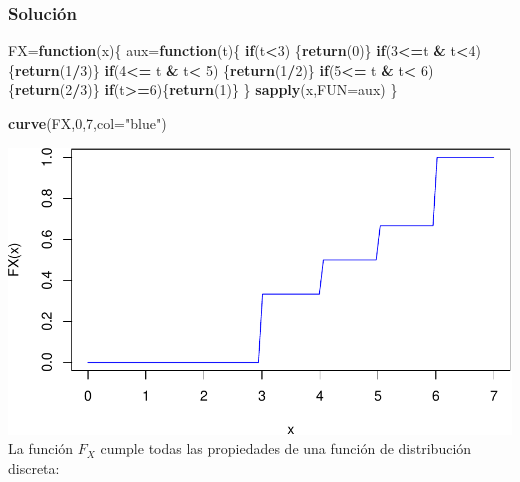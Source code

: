 \documentclass[]{article}
\newenvironment{Shaded}{\begin{snugshade}}{\end{snugshade}}
\newcommand{\ControlFlowTok}[1]{\textcolor[rgb]{0.13,0.29,0.53}{\textbf{#1}}}
\newcommand{\DataTypeTok}[1]{\textcolor[rgb]{0.13,0.29,0.53}{#1}}
\newcommand{\DecValTok}[1]{\textcolor[rgb]{0.00,0.00,0.81}{#1}}
\newcommand{\KeywordTok}[1]{\textcolor[rgb]{0.13,0.29,0.53}{\textbf{#1}}}
\newcommand{\NormalTok}[1]{#1}
\newcommand{\OperatorTok}[1]{\textcolor[rgb]{0.81,0.36,0.00}{\textbf{#1}}}
\newcommand{\StringTok}[1]{\textcolor[rgb]{0.31,0.60,0.02}{#1}}
\begin{document}
\hypertarget{soluciuxf3n-1}{%
\subsubsection{Solución}\label{soluciuxf3n-1}}

\begin{Shaded}
\begin{Highlighting}[]
\NormalTok{FX=}\ControlFlowTok{function}\NormalTok{(x)\{}
\NormalTok{  aux=}\ControlFlowTok{function}\NormalTok{(t)\{}
    \ControlFlowTok{if}\NormalTok{(t}\OperatorTok{<}\DecValTok{3}\NormalTok{) \{}\KeywordTok{return}\NormalTok{(}\DecValTok{0}\NormalTok{)\}}
    \ControlFlowTok{if}\NormalTok{(}\DecValTok{3}\OperatorTok{<=}\NormalTok{t }\OperatorTok{&}\StringTok{ }\NormalTok{t}\OperatorTok{<}\DecValTok{4}\NormalTok{) \{}\KeywordTok{return}\NormalTok{(}\DecValTok{1}\OperatorTok{/}\DecValTok{3}\NormalTok{)\}}
    \ControlFlowTok{if}\NormalTok{(}\DecValTok{4}\OperatorTok{<=}\StringTok{ }\NormalTok{t }\OperatorTok{&}\StringTok{ }\NormalTok{t}\OperatorTok{<}\StringTok{ }\DecValTok{5}\NormalTok{) \{}\KeywordTok{return}\NormalTok{(}\DecValTok{1}\OperatorTok{/}\DecValTok{2}\NormalTok{)\}}
    \ControlFlowTok{if}\NormalTok{(}\DecValTok{5}\OperatorTok{<=}\StringTok{ }\NormalTok{t }\OperatorTok{&}\StringTok{ }\NormalTok{t}\OperatorTok{<}\StringTok{ }\DecValTok{6}\NormalTok{) \{}\KeywordTok{return}\NormalTok{(}\DecValTok{2}\OperatorTok{/}\DecValTok{3}\NormalTok{)\}}
    \ControlFlowTok{if}\NormalTok{(t}\OperatorTok{>=}\DecValTok{6}\NormalTok{)\{}\KeywordTok{return}\NormalTok{(}\DecValTok{1}\NormalTok{)\}}
\NormalTok{    \}}
  \KeywordTok{sapply}\NormalTok{(x,}\DataTypeTok{FUN=}\NormalTok{aux)}
\NormalTok{\}}

\KeywordTok{curve}\NormalTok{(FX,}\DecValTok{0}\NormalTok{,}\DecValTok{7}\NormalTok{,}\DataTypeTok{col=}\StringTok{"blue"}\NormalTok{)}
\end{Highlighting}
\end{Shaded}

\includegraphics{Tema-2---Variables-Aleatorias_Soluciones_files/figure-latex/unnamed-chunk-2-1.pdf}
La función \(F_X\) cumple todas las propiedades de una función de
distribución discreta:
\end{document}
